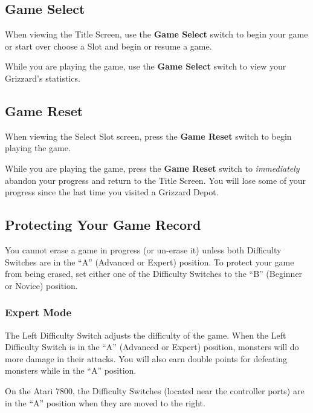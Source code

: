 \documentclass[10pt,twocolumn,openany,article]{memoir}
\begin{document}
\subsection{Game Select}

When viewing  the Title Screen,  use the \textbf{Game Select}  switch to
\ifdefined\NOSAVE begin your game or start  over \else choose a Slot and
begin or resume a game. \fi

While you  are playing the  game, use the  \textbf{Game Select}
switch to view your Grizzard's  statistics.

\subsection{Game Reset}

When  viewing the  Select  Slot screen,  press  the \textbf{Game  Reset}
switch to begin playing the game.

While you are playing the game,  press the \textbf{Game Reset} switch to
\emph{immediately} abandon your progress and return to the Title Screen.
You will  lose some  of your  progress since the  last time  you visited
a Grizzard Depot.

\ifdefined\NOSAVE\else

\subsection{Protecting Your Game Record}

You  cannot erase  a  game  in progress  (or  un-erase  it) unless  both
Difficulty  Switches are  in the  ``A'' (Advanced  or Expert)  position.
To protect your game from being erased, set either one of the Difficulty
Switches to the ``B'' (Beginner or Novice) position.

\fi

\subsubsection*{Expert Mode}

The Left Difficulty Switch adjusts the  difficulty of the game. When the
Left Difficulty  Switch is in  the ``A'' (Advanced or  Expert) position,
monsters will do more damage in their attacks. You will also earn double
points for defeating monsters while in the ``A'' position.

On the Atari 7800, the  Difficulty Switches (located near the controller
ports) are in the ``A'' position when they are moved to the right.
\end{document}
